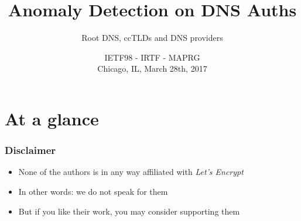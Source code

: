 \documentclass[serif]{beamer}
\title{Anomaly Detection on DNS Auths }
\subtitle{Root DNS, ccTLDs and DNS providers}
\author[Team Schnabeltier]
\date[IETF98] %
{IETF98 - IRTF - MAPRG\\
Chicago, IL, March 28th, 2017}
\newcommand{\LE}{\emph{Let's Encrypt~}}%
\begin{document}
\frame{\titlepage}

\section{At a glance}

\begin{frame}
	\frametitle{Disclaimer}
	
	\begin{itemize}
	 \item None of the authors is in any way affiliated with \LE
	 \item In other words: we do not speak for them
	 \item But if you like their work, you may consider supporting 
them


	\end{itemize}


\end{frame}
\end{document}
